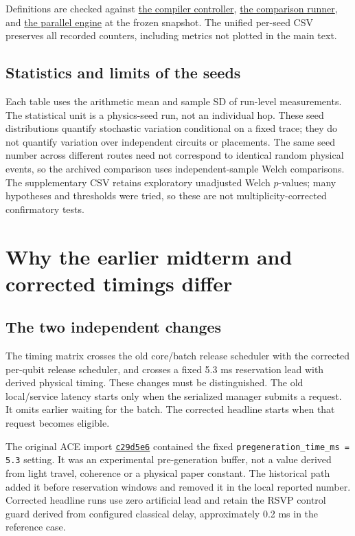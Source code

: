 \documentclass[11pt,a4paper,oneside]{report}
\newcommand{\repo}{https://github.com/sanjeevkrishnaa/Compiler-Driven-ACE}
\newcommand{\snap}{4aa334542e9b9c8fe7a5f9cc8fe48ee2e4d2fa55}
\newcommand{\src}[2]{\href{\repo/blob/\snap/#1}{#2}}
\newcommand{\commit}[1]{\href{\repo/commit/#1}{\texttt{#1}}}
\begin{document}
Definitions are checked against \src{compiler\_scheduler.py}{the compiler controller}, \src{run\_trace\_comparison.py}{the comparison runner}, and \src{parallel\_core.py}{the parallel engine} at the frozen snapshot. The unified per-seed CSV preserves all recorded counters, including metrics not plotted in the main text.

\section{Statistics and limits of the seeds}
Each table uses the arithmetic mean and sample SD of run-level measurements. The statistical unit is a physics-seed run, not an individual hop. These seed distributions quantify stochastic variation conditional on a fixed trace; they do not quantify variation over independent circuits or placements. The same seed number across different routes need not correspond to identical random physical events, so the archived comparison uses independent-sample Welch comparisons. The supplementary CSV retains exploratory unadjusted Welch $p$-values; many hypotheses and thresholds were tried, so these are not multiplicity-corrected confirmatory tests.

\chapter{Why the earlier midterm and corrected timings differ}
\section{The two independent changes}
The timing matrix crosses the old core/batch release scheduler with the corrected per-qubit release scheduler, and crosses a fixed 5.3 ms reservation lead with derived physical timing. These changes must be distinguished. The old local/service latency starts only when the serialized manager submits a request. It omits earlier waiting for the batch. The corrected headline starts when that request becomes eligible.

The original ACE import \commit{c29d5e6} contained the fixed \texttt{pregeneration\_time\_ms = 5.3} setting. It was an experimental pre-generation buffer, not a value derived from light travel, coherence or a physical paper constant. The historical path added it before reservation windows and removed it in the local reported number. Corrected headline runs use zero artificial lead and retain the RSVP control guard derived from configured classical delay, approximately 0.2 ms in the reference case.
\end{document}
